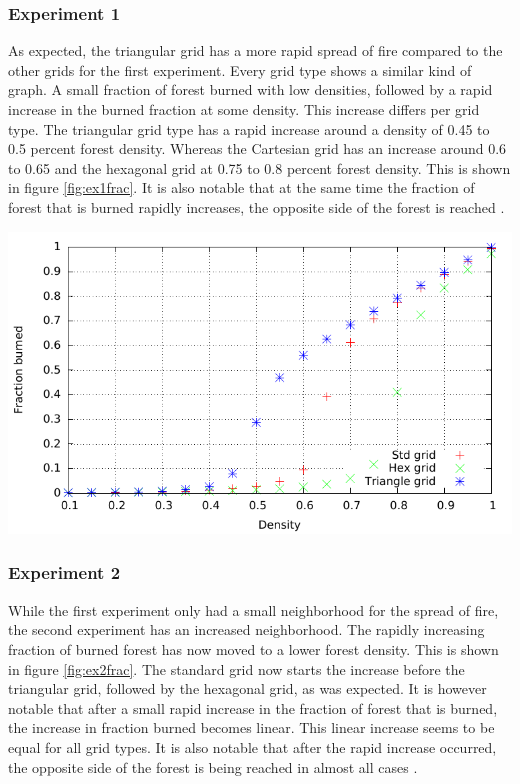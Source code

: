 \documentclass{article}
\newenvironment{Figure}
  {\par\medskip\noindent\minipage{\linewidth}}
  {\endminipage\par\medskip}
\begin{document}
\begin{multicols}{2}
\subsubsection*{Experiment 1}
As expected, the triangular grid has a more rapid spread of fire compared to the other grids for the first experiment. Every grid type shows a similar kind of graph. A small fraction of forest burned with low densities, followed by a rapid increase in the burned fraction at some density. This increase differs per grid type. The triangular grid type has a rapid increase around a density of 0.45 to 0.5 percent forest density. Whereas the Cartesian grid has an increase around 0.6 to 0.65 and the hexagonal grid at 0.75 to 0.8 percent forest density. This is shown in figure \ref{fig:ex1frac}. It is also notable that at the same time the fraction of forest that is burned rapidly increases, the opposite side of the forest is reached \cite{allresults}.
\begin{Figure}
 \centering
 \includegraphics[width=\textwidth]{imgs/plot/ex1/fracburned.pdf}
\label{fig:ex1frac}
\end{Figure}

\subsubsection*{Experiment 2}
While the first experiment only had a small neighborhood for the spread of fire, the second experiment has an increased neighborhood. The rapidly increasing fraction of burned forest has now moved to a lower forest density. This is shown in figure \ref{fig:ex2frac}. The standard grid now starts the increase before the triangular grid, followed by the hexagonal grid, as was expected. It is however notable that after a small rapid increase in the fraction of forest that is burned, the increase in fraction burned becomes linear. This linear increase seems to be equal for all grid types. It is also notable that after the rapid increase occurred, the opposite side of the forest is being reached in almost all cases \cite{allresults}.


\end{multicols}
\end{document}
